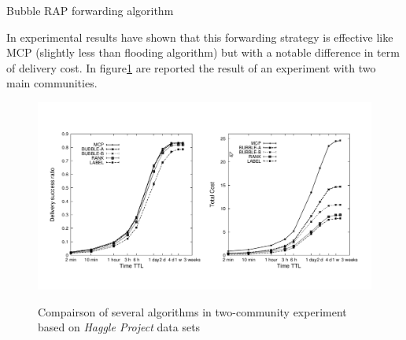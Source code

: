 \begin{algorithm}
\caption{Bubble RAP forwarding algorithm}
\label{r_bubble_alg}
\begin{algorithmic}
 		\ENDIF 
 \ELSE
 		\ENDIF 
 \ENDIF
 \ENDFOR
\end{algorithmic}
\end{algorithm}

In \cite{bubble} experimental results have shown that this forwarding strategy is effective like MCP (slightly less than flooding algorithm) but with a notable difference in term of delivery cost. In figure\ref{fig:bubblerap-performance} are reported the result of an experiment with two main communities.

\begin{figure}[h!]
	\begin{center}
    \label{fig:bubblerap-performance}
    \includegraphics[scale=0.35]{img/bubblerap-performance.png}
    \caption{Compairson of several algorithms in two-community experiment based on \emph{Haggle Project} data sets}
  \end{center}
\end{figure}
